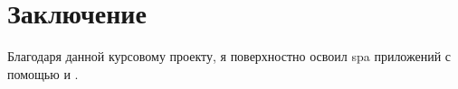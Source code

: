 \section{Заключение}
Благодаря данной курсовому проекту, я поверхностно освоил \acrshort{spa} приложений с помощью \textcite{react} и \textcite{express}.

\clearpage
